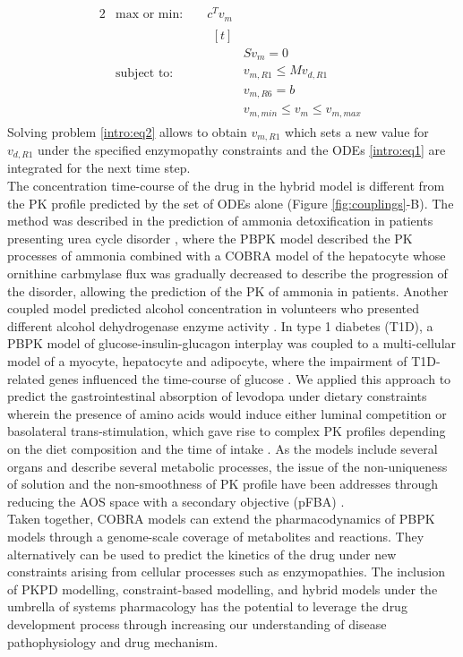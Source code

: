 \begin{alignat}{2}
  & \text{max or min: } &  & c^{T}v_{m}  \label{intro:eq2}\\
  & \text{subject to: } &  & \nonumber
                \begin{aligned}[t] \\
                & Sv_{m}=0 \\
                & v_{m,R1} \leq Mv_{d,R1} \\
                & v_{m,R6} = b \\
                & v_{m,min} \leq v_m \leq  v_{m,max}
                \end{aligned}
                \nonumber
\end{alignat} 
Solving problem \ref{intro:eq2} allows to obtain $v_{m,R1}$ which sets a new value for $v_{d,R1}$ under the specified enzymopathy constraints and the ODEs \ref{intro:eq1} are integrated for the next time step.\\
The concentration time-course of the drug in the hybrid model is different from the PK profile predicted by the set of ODEs alone (Figure \ref{fig:couplings}-B). The method was described in the prediction of ammonia detoxification in patients presenting urea cycle disorder \cite{krauss2012integrating}, where the PBPK model described the PK processes of ammonia combined with a COBRA model of the hepatocyte whose ornithine carbmylase flux was gradually decreased to describe the progression of the disorder, allowing the prediction of  the PK of ammonia in patients. Another coupled model predicted alcohol concentration in volunteers who presented different alcohol dehydrogenase enzyme activity \cite{toroghi2016multiscale}. In type 1 diabetes (T1D), a PBPK model of glucose-insulin-glucagon interplay was coupled to a multi-cellular model of a myocyte, hepatocyte and adipocyte, where the impairment of T1D-related genes influenced the time-course of glucose \cite{wadehn2016multiscale}.   
We applied this approach to predict the gastrointestinal absorption of levodopa under dietary constraints wherein the presence of amino acids would induce either luminal competition or basolateral trans-stimulation, which gave rise to complex PK profiles depending on the diet composition and the time of intake \cite{guebila2016model}.
As the models include several organs and describe several metabolic processes, the issue of the non-uniqueness of solution and the non-smoothness of PK profile have been addresses through reducing the AOS space with a secondary objective (pFBA) \cite{toroghi2016multi}.\\
Taken together, COBRA models can extend the pharmacodynamics of PBPK models through a genome-scale coverage of metabolites and reactions. They alternatively can be used to predict the kinetics of the drug under new constraints arising from cellular processes such as enzymopathies. 
The inclusion of PKPD modelling, constraint-based modelling, and hybrid models under the umbrella of systems pharmacology \cite{van2011systems} has the potential to leverage the drug development process through increasing our understanding of disease pathophysiology and drug mechanism.
